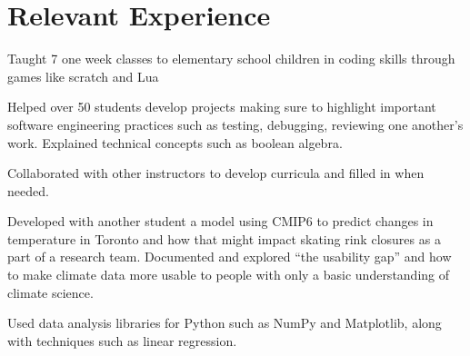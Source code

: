 \documentclass[letterpaper,10pt]{article}
\begin{document}
    \section{Relevant Experience}
    \begin{resume_list}
        \item Taught 7 one week classes to elementary school children in coding skills through games like scratch and Lua
        \item Helped over 50 students develop projects making sure to highlight important software engineering practices
        such as testing, debugging, reviewing one another's work. Explained technical concepts such as boolean algebra. 
        \item Collaborated with other instructors to develop curricula and filled in when needed.
    \end{resume_list}

    \begin{resume_list}
        \item Developed with another student a model using CMIP6 to predict changes in temperature in Toronto and how that might impact
        skating rink closures as a part of a research team. Documented and explored ``the usability gap'' and how to make climate data more usable to people with only a basic understanding of climate science.
        \item Used data analysis libraries for Python such as NumPy and Matplotlib, along with techniques such as linear regression.
    \end{resume_list}
\end{document}

